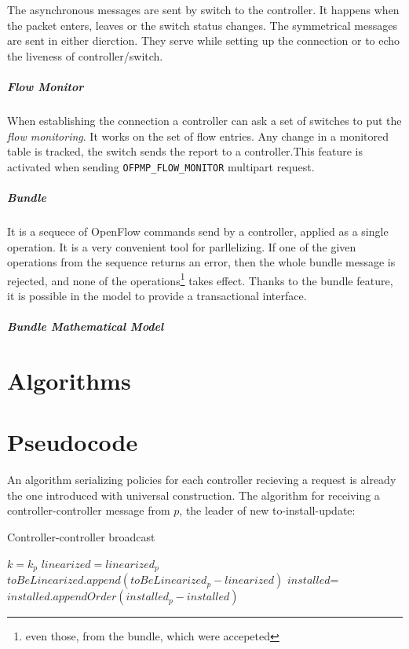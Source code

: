\documentclass{article}
\begin{document}
The asynchronous messages are sent by switch to the controller. It happens when the packet enters, leaves or the switch status changes.  The symmetrical messages are sent in either dierction. They serve while setting up the connection or to echo the liveness of controller/switch. 
\subparagraph{Flow Monitor}  When establishing the connection a controller can ask a set of switches to put the \emph{flow monitoring}. It works on the set of flow entries. Any change in a monitored table is tracked, the switch sends the report to a controller.This feature is activated when sending 
\texttt{OFPMP\_FLOW\_MONITOR} multipart request.  
\subparagraph{Bundle} It is a sequece of OpenFlow commands send by a 
controller, applied as a single operation. It is a very convenient tool for parllelizing. If one of the given operations from the sequence returns an error, then the whole bundle message is rejected, and none of the operations\footnote{even those, from the bundle, which were accepeted} takes effect. 
Thanks to the bundle feature, it is possible in the model to provide a transactional interface.
\subparagraph{Bundle Mathematical Model}
\section{Algorithms}
%

%
\section{Pseudocode}

%
An algorithm serializing policies for each controller recieving a request is already the one introduced with universal construction.
The algorithm for receiving a controller-controller message from $p$, the leader of new to-install-update:
\begin{algorithm}
\caption{Controller-controller broadcast}\label{BroadcastCC}
  \begin{algorithmic}[1]
     $k=k_p$
    \EndIf
     $linearized = linearized_p$
    \EndIf
    \State $toBeLinearized.append(toBeLinearized_p-linearized)$
    \State $installed$=$installed.appendOrder(installed_p-installed)$
    \EndProcedure
  \end{algorithmic}
\end{algorithm}
\end{document}

